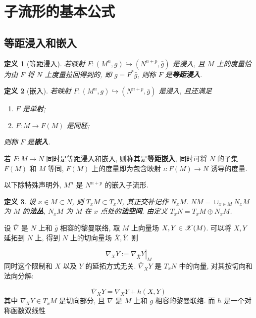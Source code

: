 \documentclass{ctexart}
\newtheorem{definition}{定义}
\begin{document}
\section{子流形的基本公式}
\subsection{等距浸入和嵌入}
\begin{definition}[等距浸入]
	若映射 $F\colon (M^n, g) \hookrightarrow (N^{n + p}, \bar{g})$ 是浸入, 且 $M$ 上的度量恰为由 $F$ 将 $N$ 上度量拉回得到的, 即 $g = F^{\ast}\bar{g}$, 则称 $F$ 是{\bf 等距浸入}.
\end{definition}

\begin{definition}[嵌入]
	若映射 $F\colon (M^n, g) \hookrightarrow (N^{n + p}, \bar{g})$ 是浸入, 且还满足
	\begin{enumerate}
		\item $F$ 是单射;
		\item $F\colon M \rightarrow F(M)$ 是同胚;
	\end{enumerate}
	则称 $F$ 是{\bf 嵌入}.
\end{definition}

若 $F \colon M \rightarrow N$ 同时是等距浸入和嵌入, 则称其是{\bf 等距嵌入}, 同时可将 $N$ 的子集 $F(M)$ 和 $M$ 等同, $F(M)$ 上的度量即为包含映射 $\iota \colon F(M) \rightarrow N$ 诱导的度量.

以下除特殊声明外, $M^n$ 是 $N^{n + p}$ 的嵌入子流形.

\begin{definition}
	设 $x \in M \subset N$, 则 $T_xM \subset T_xN$, 其正交补记作 $N_xM$. $NM = \cup_{x \in M}N_xM$ 为 $M$ 的{\bf 法丛}, $N_xM$ 为 $M$ 在 $x$ 点处的{\bf 法空间}. 由定义 $T_xN = T_x{M} \oplus N_xM$.
\end{definition}

设 $\bar{\nabla}$ 是 $N$ 上和 $\bar{g}$ 相容的黎曼联络, 取 $M$ 上向量场 $X, Y \in \mathscr{X}(M)$. 可以将 $X, Y$ 延拓到 $N$ 上, 得到 $N$ 上的切向量场 $\bar{X}, \bar{Y}$. 则

$$
	\bar{\nabla}_{X}Y := \left.\bar{\nabla}_{\bar{X}}\bar{Y}\right|_{M}
$$
同时这个限制和 $X$ 以及 $Y$ 的延拓方式无关. $\bar{\nabla}_{X}Y$ 是 $T_xN$ 中的向量, 对其按切向和法向分解:

\begin{equation}\label{eq::Gauss-formula}
	\bar{\nabla}_{X}Y = \nabla_XY + h(X, Y)
\end{equation}
其中 $\nabla_XY \in T_xM$ 是切向部分, 且 $\nabla$ 是 $M$ 上和 $g$ 相容的黎曼联络. 而 $h$ 是一个对称函数双线性 
\end{document}

